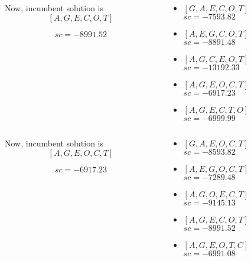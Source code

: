 	\begin{frame}[fragile]
		\begin{columns}
			\begin{column}{.5\linewidth}
				Now, incumbent solution is
					\[ [ A , G , E , C , O , T ] \]
				\begin{figure}
					\centering
					
				\end{figure}
				\[ {sc} = -8991.52 \]
			\end{column}
			\begin{column}{.4\linewidth}
				\begin{itemize}
					\item $[ G , A , E , C , O , T ]$\\$sc = -7593.82$
					\item $[ A , E , G , C , O , T ]$\\$sc = -8891.48$
					\item $[ A , G , C , E , O , T ]$\\$sc = -13192.33$
					\item \alert{$[ A , G , E , O , C , T ]$\\$sc = -6917.23$}
					\item $[ A , G , E , C , T , O ]$\\$sc = -6999.99$
				\end{itemize}
			\end{column}
		\end{columns}
	\end{frame}
	
	\begin{frame}[fragile]
		\begin{columns}
			\begin{column}{.5\linewidth}
				Now, incumbent solution is
					\[ [ A , G , E , O , C , T ] \]
				\begin{figure}
					\centering
					
				\end{figure}
				\[ {sc} = -6917.23 \]
			\end{column}
			\begin{column}{.4\linewidth}
				\begin{itemize}
					\item $[ G , A , E , O , C , T ]$\\$sc = -8593.82$
					\item $[ A , E , G , O , C , T ]$\\$sc = -7289.48$
					\item $[ A , G , O , E , C , T ]$\\$sc = -9145.13$
					\item $[ A , G , E , C , O , T ]$\\$sc = -8991.52$
					\item $[ A , G , E , O , T , C ]$\\$sc = -6991.08$
				\end{itemize}
			\end{column}
		\end{columns}
	\end{frame}